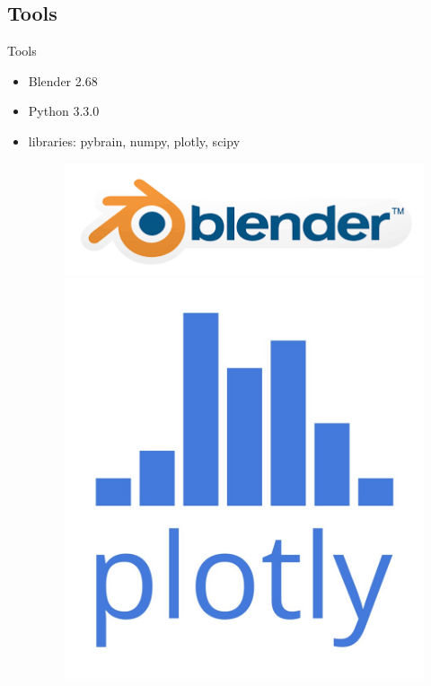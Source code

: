 \documentclass[xcolor=x11names,compress]{beamer}
\renewcommand{\(}{\begin{columns}}
\renewcommand{\)}{\end{columns}}
\newcommand{\<}[1]{\begin{column}{#1}}
\renewcommand{\>}{\end{column}}
\begin{document}
\subsection{Tools}
\begin{frame}{Tools}
	\begin{itemize}
		\item{Blender 2.68} %
		\item{Python 3.3.0} %

		\item{libraries: pybrain, numpy, plotly, scipy
                    \begin{figure}[!htb]
                      \includegraphics[width=\linewidth]{blender.png}
                    \endminipage\hfill
                      \includegraphics[width=\linewidth]{plotly.jpg}
                    \endminipage


\end{figure}}
\end{itemize}
\end{frame}
\end{document}
